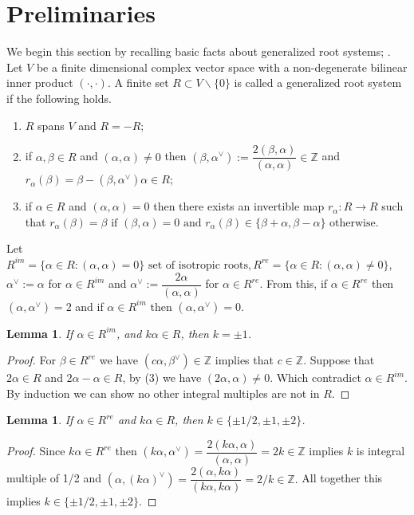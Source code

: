 \documentclass[11pt]{amsart}
\theoremstyle{plain}
\newtheorem{lemma}[thm]{Lemma}
\theoremstyle{definition}
\numberwithin{equation}{section}
\newcommand{\al}{\alpha}
\newcommand{\be}{\beta}
\newcommand{\Z}{\mbox{$\mathbb Z$}}
\begin{document}
	\section{Preliminaries}\label{sec2}
	
	We begin this section by recalling basic facts about generalized root systems; \cite{serganova1996generalizations}. Let $V$ be a finite dimensional complex vector space with a non-degenerate bilinear inner product $(\cdot,\cdot)$. A finite set $R\subset V\backslash\{0\}$ is called a generalized root system if the following holds.
		\begin{enumerate}
			\item[(1)] $R$ spans $V$ and $R=-R$;
			\item[(2)] if $\alpha,\beta\in R$ and $(\alpha,\alpha)\neq0$ then $(\beta,\alpha^{\vee}):=\dfrac{2(\beta,\alpha)}{(\alpha,\alpha)}\in\Z$ and $r_{\alpha}(\beta)=\beta-(\beta,\alpha^{\vee})\alpha\in R$;
			\item[(3)] if $\alpha\in R$ and $(\alpha,\alpha)=0$ then there exists an invertible map $r_{\alpha}:R\rightarrow R$ such that $r_{\alpha}(\beta)=\beta \text{ if }(\beta,\alpha)=0\text{ and }r_{\alpha}(\beta)\in\{\be+\al,\be-\al\}\text{ otherwise}$.
		\end{enumerate}
Let $R^{im}=\{\alpha\in R:(\alpha,\alpha)=0\} \text{ set of isotropic roots},R^{re}=\{\alpha\in R:(\alpha,\alpha)\neq0\}$, $\alpha^{\vee}:=\alpha$ for $\alpha\in R^{im}$ and $\alpha^{\vee}:=\dfrac{2\alpha}{(\alpha,\alpha)}$ for $\alpha\in R^{re}$. From this, if $\alpha\in R^{re}$ then $(\alpha,\alpha^{\vee})=2$ and if $\alpha\in R^{im}$ then $(\alpha,\alpha^{\vee})=0$.
	\begin{lemma}\label{lem0}
		If $\al\in R^{im}$, and $k\al\in R$,  then $k=\pm 1$.
	\end{lemma}
	\begin{proof}
		For $\be\in R^{re}$ we have $(c\al,\be^{\vee})\in\Z$ implies that $c\in\Z$.
		Suppose that $2\al\in R$ and $2\al-\al\in R$, by (3) we have $(2\al,\al)\neq0$. Which contradict $\al\in R^{im}$. By induction we can show no other integral multiples are not in $R$.
	\end{proof}
	\begin{lemma}\label{lem4}
	If $\al\in R^{re}$ and $k\al\in R$, then $k\in\{\pm1/2,\pm1,\pm2\}$.
	\end{lemma}
	\begin{proof}
	Since $k\al\in R^{re}$ then $(k\al,\al^{\vee})=\dfrac{2(k\al,\al)}{(\al,\al)}=2k\in\Z$ implies $k$ is integral multiple of 1/2 and $(\al,(k\al)^{\vee})=\dfrac{2(\al,k\al)}{(k\al,k\al)}=2/k\in\Z.$ All together this implies $k\in\{\pm1/2,\pm1,\pm2\}$.
	\end{proof}
\end{document}
